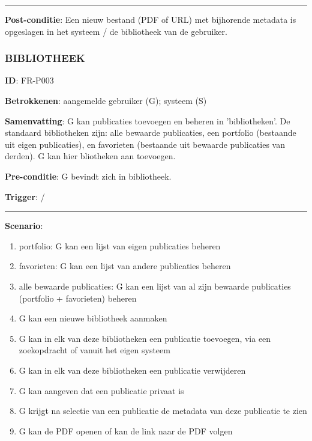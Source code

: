 \vspace{2 mm}
\hrule
\vspace{4 mm}

\noindent \textbf{Post-conditie}: Een nieuw bestand (PDF of URL) met bijhorende metadata is opgeslagen in het systeem / de bibliotheek van de gebruiker. \\


\subsubsection{BIBLIOTHEEK}
\vspace{2 mm}

\textbf{ID}: FR-P003
\vspace{2 mm}

\noindent \textbf{Betrokkenen}: aangemelde gebruiker (G); systeem (S) 
\vspace{2 mm}

\noindent \textbf{Samenvatting}: G kan publicaties toevoegen en beheren in 'bibliotheken'. De standaard bibliotheken zijn: alle bewaarde publicaties, een portfolio (bestaande uit eigen publicaties), en favorieten (bestaande uit bewaarde publicaties van derden). G kan hier bliotheken aan toevoegen. 
\vspace{2 mm}

\noindent \textbf{Pre-conditie}: G bevindt zich in bibliotheek. 
\vspace{2 mm}

\noindent \textbf{Trigger}: / 
\vspace{4 mm}

\hrule
\vspace{2 mm}
\noindent \textbf{Scenario}:
\begin{enumerate}
\item portfolio: G kan een lijst van eigen publicaties beheren 
\item favorieten: G kan een lijst van andere publicaties beheren 
\item alle bewaarde publicaties: G kan een lijst van al zijn bewaarde publicaties (portfolio + favorieten) beheren 
\item G kan een nieuwe bibliotheek aanmaken
\item G kan in elk van deze bibliotheken een publicatie toevoegen, via een zoekopdracht of vanuit het eigen systeem 
\item G kan in elk van deze bibliotheken een publicatie verwijderen 
\item G kan aangeven dat een publicatie privaat is 
\item G krijgt na selectie van een publicatie de metadata van deze publicatie te zien
\item G kan de PDF openen of kan de link naar de PDF volgen 
\end{enumerate}

